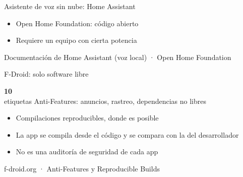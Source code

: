\documentclass[aspectratio=169,12pt]{beamer}
\def\navprev{}
\def\navnext{}
\newcommand{\nav}[2]{\gdef\navprev{#1}\gdef\navnext{#2}}
\newcommand{\cifra}[2]{%
  \begin{center}
    {\color{terra}\fontsize{36}{40}\selectfont\bfseries #1}\\[0.2cm]
    {\large #2}
  \end{center}}
\newcommand{\fuente}[1]{\vfill{\small\color{gris}#1\par}}
\begin{document}
\nav{Localización sin GPS}{F-Droid}
\begin{frame}{Asistente de voz sin nube: Home Assistant}
  \begin{center}
  \end{center}
  \vspace{0.2cm}
  \begin{itemize}
    \item Open Home Foundation: código abierto
    \item Requiere un equipo con cierta potencia
  \end{itemize}
  \fuente{Documentación de Home Assistant (voz local) · Open Home Foundation}
\end{frame}

\nav{Home Assistant}{Móvil sin Google}
\begin{frame}{F-Droid: solo software libre}
  \cifra{10}{etiquetas Anti-Features: anuncios, rastreo, dependencias no libres}
  \begin{itemize}
    \item Compilaciones reproducibles, donde es posible
    \item La app se compila desde el código y se compara con la del desarrollador
    \item \alert{No es una auditoría de seguridad de cada app}
  \end{itemize}
  \fuente{f-droid.org · Anti-Features y Reproducible Builds}
\end{frame}
\end{document}
